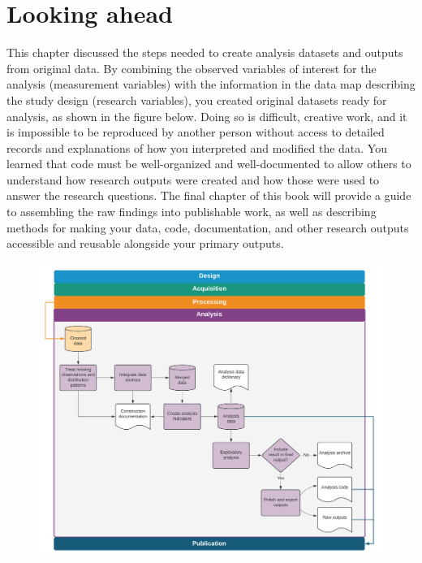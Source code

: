 \section{Looking ahead}
This chapter discussed the steps needed to
create analysis datasets and outputs from original data.
By combining the observed variables of interest for the analysis (measurement variables)
with the information in the data map describing the study design (research variables),
you created original datasets ready for analysis,
as shown in the figure below.
Doing so is difficult, creative work,
and it is impossible to be reproduced by another person
without access to detailed records and explanations
of how you interpreted and modified the data.
You learned that code must be well-organized and well-documented
to allow others to understand how research outputs were created
and how those were used to answer the research questions.
The final chapter of this book will provide a guide
to assembling the raw findings into publishable work,
as well as describing methods for making your data,
code, documentation, and other research outputs
accessible and reusable alongside your primary outputs.

\begin{fullwidth}
	\begin{figure}
		\centering
		\includegraphics[width=1.6\linewidth]{diagrams/Analysis}
		\label{fig:analysis}
	\end{figure}
\end{fullwidth}


